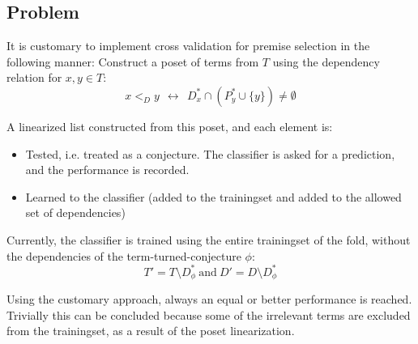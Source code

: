 \subsection{Problem}
It is customary to implement cross validation for premise selection in the following manner:
Construct a poset of terms from $T$ using the dependency relation for $x, y \in T$:
\[
	x <_D y ~~\leftrightarrow~~ D^*_x \cap (P^*_y \cup \{y\}) \neq \emptyset
\]

A linearized list constructed from this poset, and each element is:
\begin{itemize}
\item Tested, i.e. treated as a conjecture.
	The classifier is asked for a prediction, and the performance is recorded.
\item Learned to the classifier (added to the trainingset and added to the allowed set of dependencies)
\end{itemize}

Currently, the classifier is trained using the entire trainingset of the fold, without the dependencies of the term-turned-conjecture $\phi$:
\[
	T' = T \setminus D^*_\phi ~\text{and}~ D' = D \setminus D^*_\phi
\]

Using the customary approach, always an equal or better performance is reached.
Trivially this can be concluded because some of the irrelevant terms are excluded from the trainingset, as a result of the poset linearization.
